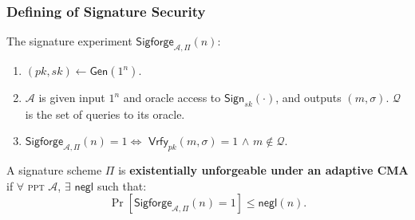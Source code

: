\begin{frame}\frametitle{Defining of Signature Security}
The signature experiment $\mathsf{Sigforge}_{\mathcal{A},\Pi }(n)$:
\begin{enumerate}
\item $(pk,sk) \gets \mathsf{Gen}(1^n)$.
\item $\mathcal{A}$ is given input $1^n$ and oracle access to $\mathsf{Sign}_{sk}(\cdot)$, and outputs $(m,\sigma)$. $\mathcal{Q}$ is the set of queries to its oracle.
\item $\mathsf{Sigforge}_{\mathcal{A},\Pi }(n)=1 \iff$ $\mathsf{Vrfy}_{pk}(m,\sigma)=1$ $\land$ $m \notin \mathcal{Q}$. 
\end{enumerate}
\begin{definition}
A signature scheme $\Pi$ is \textbf{existentially unforgeable under an adaptive CMA} if $\forall$ \textsc{ppt} $\mathcal{A}$, $\exists$ $\mathsf{negl}$ such that:
\[ \Pr [\mathsf{Sigforge}_{\mathcal{A},\Pi }(n)=1] \le \mathsf{negl}(n).
\]
\end{definition}
\end{frame}
